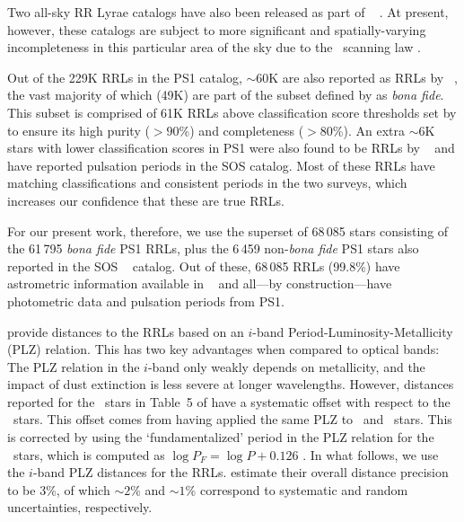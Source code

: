 \documentclass[twocolumn]{aastex63}
\newcommand{\sa}[1]{{\color{teal} SP: #1}}
\begin{document}
Two all-sky RR Lyrae catalogs have also been released as part of \Gaia~ \citep[VariClassifier and Specific Object Studies][]{Holl2018, Rimoldini2018, Clementini2018}. At present, however, these catalogs are subject to more significant and spatially-varying incompleteness in this particular area of the sky due to the \Gaia\ scanning law \citep[see][though many of these issues will go away with future \Gaia\ data releases]{Rimoldini2018}.

Out of the 229K RRLs in the PS1 catalog, $\sim60$K are also reported as RRLs by \Gaia~, the vast majority of which (49K) are part of the subset defined by \citet{Sesar:2017b} as \emph{bona fide}. This subset is comprised of 61K RRLs above classification score thresholds set by \citet{Sesar:2017b} to ensure its high purity ($>90$\%) and completeness ($>80$\%). An extra $\sim6$K stars with lower classification scores in PS1 were also found to be RRLs by \Gaia~ and have reported pulsation periods in the SOS catalog. Most of these RRLs have matching classifications and consistent periods in the two surveys, which increases our confidence that these are true RRLs.

For our present work, therefore, we use the superset of 68\,085 stars consisting of the 61\,795 \emph{bona fide} PS1 RRLs, plus the 6\,459 non-\emph{bona fide} PS1 stars also reported in the SOS \Gaia~ catalog. Out of these, 68\,085 RRLs (99.8\%) have astrometric information available in \Gaia~ and all---by construction---have photometric data and pulsation periods from PS1.

\citet{Sesar:2017b} provide distances to the RRLs based on an $i$-band Period-Luminosity-Metallicity (PLZ) relation.
This has two key advantages when compared to optical bands: The PLZ relation in the $i$-band only weakly depends on metallicity, and the impact of dust extinction is less severe at longer wavelengths.
However, distances reported for the \rrc~stars in Table~5 of \citet{Sesar:2017b} have a systematic offset with respect to the \typeab~stars.
This offset comes from having applied the same PLZ to \typeab~and \typec~stars.
This is corrected by using the `fundamentalized' period in the PLZ relation for the \rrc~stars, which is computed as $\log{P_F} = \log P + 0.126$ \citep[following][]{Braga2016}.
In what follows, we use the $i$-band PLZ distances for the RRLs.
\citet{Sesar:2017b} estimate their overall distance precision to be 3\%, of which $\sim2$\% and $\sim1$\% correspond to systematic and random uncertainties, respectively.
\end{document}
